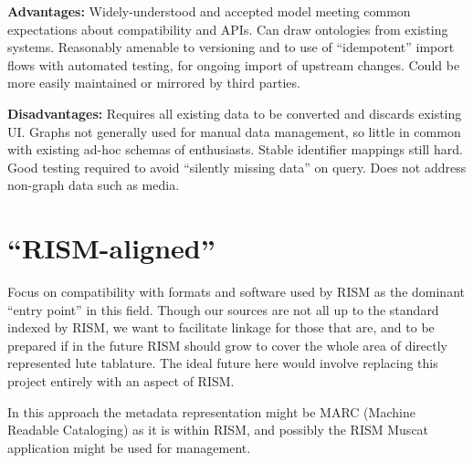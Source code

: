 \documentclass[a0,landscape]{a0poster}
\begin{document}
\begin{multicols}{3}
\begin{sloppypar}
  \noindent\textbf{Advantages:} Widely-understood and accepted model
  meeting common expectations about compatibility and APIs. Can draw
  ontologies from existing systems. Reasonably amenable to versioning
  and to use of ``idempotent'' import flows with automated testing,
  for ongoing import of upstream changes. Could be more easily
  maintained or mirrored by third parties.

  \noindent\textbf{Disadvantages:} Requires all existing data to be
  converted and discards existing UI. Graphs not generally used for
  manual data management, so little in common with existing ad-hoc
  schemas of enthusiasts. Stable identifier mappings still hard. Good
  testing required to avoid ``silently missing data'' on query. Does
  not address non-graph data such as media.
  
  \vspace{-1cm}
  \section{``RISM-aligned''}

  Focus on compatibility with formats and software used by RISM as the
  dominant ``entry point'' in this field. Though our sources are not
  all up to the standard indexed by RISM, we want to facilitate
  linkage for those that are, and to be prepared if in the future RISM
  should grow to cover the whole area of directly represented lute
  tablature. The ideal future here would involve replacing this
  project entirely with an aspect of RISM.

  \noindent In this approach the metadata representation might be MARC
  (Machine Readable Cataloging) as it is within RISM, and possibly the
  RISM Muscat application might be used for management.
  
\end{sloppypar}
  
\end{multicols}
\end{document}
